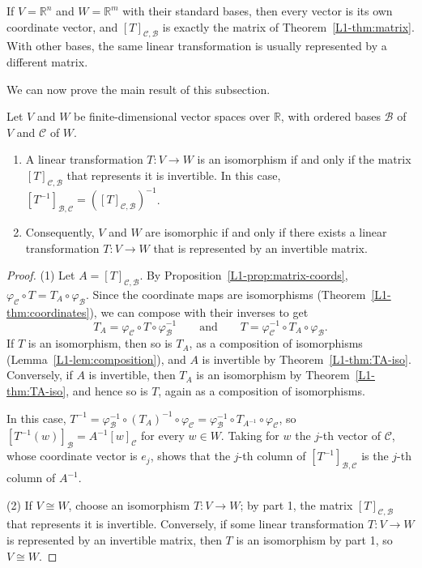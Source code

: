 \begin{remark}
    If $V = \mathbb{R}^n$ and $W = \mathbb{R}^m$ with their standard bases, then every vector is its own coordinate vector, and $[T]_{\mathcal{C}, \mathcal{B}}$ is exactly the matrix of Theorem~\ref{L1-thm:matrix}. With other bases, the same linear transformation is usually represented by a different matrix.
\end{remark}

We can now prove the main result of this subsection.

\begin{theorem}\label{L1-thm:iso-matrix}
    Let $V$ and $W$ be finite-dimensional vector spaces over $\mathbb{R}$, with ordered bases $\mathcal{B}$ of $V$ and $\mathcal{C}$ of $W$.
    \begin{enumerate}
        \item A linear transformation $T: V \to W$ is an isomorphism if and only if the matrix $[T]_{\mathcal{C}, \mathcal{B}}$ that represents it is invertible. In this case, $[T^{-1}]_{\mathcal{B}, \mathcal{C}} = ([T]_{\mathcal{C}, \mathcal{B}})^{-1}$.
        \item Consequently, $V$ and $W$ are isomorphic if and only if there exists a linear transformation $T: V \to W$ that is represented by an invertible matrix.
    \end{enumerate}
\end{theorem}

\begin{proof}
    (1) Let $A = [T]_{\mathcal{C}, \mathcal{B}}$. By Proposition~\ref{L1-prop:matrix-coords}, $\varphi_{\mathcal{C}} \circ T = T_A \circ \varphi_{\mathcal{B}}$. Since the coordinate maps are isomorphisms (Theorem~\ref{L1-thm:coordinates}), we can compose with their inverses to get
    \[T_A = \varphi_{\mathcal{C}} \circ T \circ \varphi_{\mathcal{B}}^{-1} \qquad \text{and} \qquad T = \varphi_{\mathcal{C}}^{-1} \circ T_A \circ \varphi_{\mathcal{B}}.\]
    If $T$ is an isomorphism, then so is $T_A$, as a composition of isomorphisms (Lemma~\ref{L1-lem:composition}), and $A$ is invertible by Theorem~\ref{L1-thm:TA-iso}. Conversely, if $A$ is invertible, then $T_A$ is an isomorphism by Theorem~\ref{L1-thm:TA-iso}, and hence so is $T$, again as a composition of isomorphisms.

    In this case, $T^{-1} = \varphi_{\mathcal{B}}^{-1} \circ (T_A)^{-1} \circ \varphi_{\mathcal{C}} = \varphi_{\mathcal{B}}^{-1} \circ T_{A^{-1}} \circ \varphi_{\mathcal{C}}$, so $[T^{-1}(w)]_{\mathcal{B}} = A^{-1} [w]_{\mathcal{C}}$ for every $w \in W$. Taking for $w$ the $j$-th vector of $\mathcal{C}$, whose coordinate vector is $e_j$, shows that the $j$-th column of $[T^{-1}]_{\mathcal{B}, \mathcal{C}}$ is the $j$-th column of $A^{-1}$.

    (2) If $V \cong W$, choose an isomorphism $T: V \to W$; by part 1, the matrix $[T]_{\mathcal{C}, \mathcal{B}}$ that represents it is invertible. Conversely, if some linear transformation $T: V \to W$ is represented by an invertible matrix, then $T$ is an isomorphism by part 1, so $V \cong W$.
\end{proof}

